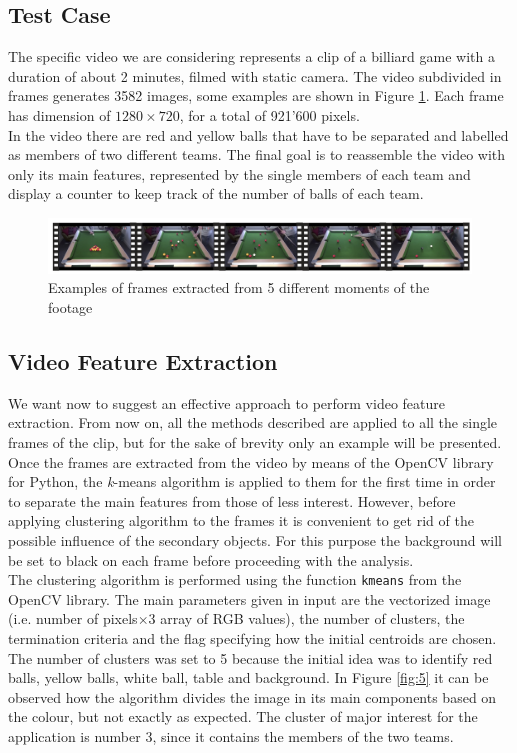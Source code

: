 \documentclass{usiinftr}
\begin{document}
\subsection{Test Case}
The specific video we are considering represents a clip of a billiard game with a duration of about 2 minutes, filmed with static camera. The video subdivided in frames generates 3582 images, some examples are shown in Figure \ref{fig:4}. Each frame has dimension of $1280 \times 720$,  for a total of 921'600 pixels. \\
In the video there are red and yellow balls that have to be separated and labelled as members of two different teams. The final goal is to reassemble the video with only its main features, represented by the single members of each team and display a counter to keep track of the number of balls of each team. 

\begin{figure}[h]
	\centering
	\includegraphics[width=0.98\linewidth]{img/video_frames}
	\caption{Examples of frames extracted from 5 different moments of the footage}
	\label{fig:4}
\end{figure}

\subsection{Video Feature Extraction}
We want now to suggest an effective approach to perform video feature extraction. From now on, all the methods described are applied to all the single frames of the clip, but for the sake of brevity only an example will be presented.  \\
Once the frames are extracted from the video by means of the OpenCV library for Python, the \textit{k}-means algorithm is applied to them for the first time in order to separate the main features from those of less interest. However, before applying clustering algorithm to the frames it is convenient to get rid of the possible influence of the secondary objects. For this purpose the background will be set to black on each frame before proceeding with the analysis. \\
The clustering algorithm is performed using the function \texttt{kmeans} from the OpenCV library. The main parameters given in input are the vectorized image (i.e. number of pixels$\times 3$ array of RGB values), the number of clusters, the termination criteria  and the flag specifying how the initial centroids are chosen. The number of clusters was set to 5 because the initial idea was to identify red balls, yellow balls, white ball, table and background. 
In Figure \ref{fig:5} it can be observed how the algorithm divides the image in its main components based on the colour, but not exactly as expected. The cluster of major interest for the application is number 3, since it contains the members of the two teams. 
\end{document}
